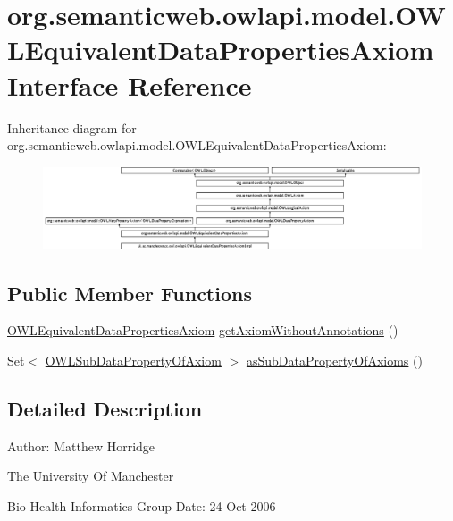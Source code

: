 \hypertarget{interfaceorg_1_1semanticweb_1_1owlapi_1_1model_1_1_o_w_l_equivalent_data_properties_axiom}{\section{org.\-semanticweb.\-owlapi.\-model.\-O\-W\-L\-Equivalent\-Data\-Properties\-Axiom Interface Reference}
\label{interfaceorg_1_1semanticweb_1_1owlapi_1_1model_1_1_o_w_l_equivalent_data_properties_axiom}
}
Inheritance diagram for org.\-semanticweb.\-owlapi.\-model.\-O\-W\-L\-Equivalent\-Data\-Properties\-Axiom\-:\begin{figure}[H]
\begin{center}
\leavevmode
\includegraphics[height=2.456140cm]{interfaceorg_1_1semanticweb_1_1owlapi_1_1model_1_1_o_w_l_equivalent_data_properties_axiom}
\end{center}
\end{figure}
\subsection*{Public Member Functions}
\begin{DoxyCompactItemize}
\item 
\hyperlink{interfaceorg_1_1semanticweb_1_1owlapi_1_1model_1_1_o_w_l_equivalent_data_properties_axiom}{O\-W\-L\-Equivalent\-Data\-Properties\-Axiom} \hyperlink{interfaceorg_1_1semanticweb_1_1owlapi_1_1model_1_1_o_w_l_equivalent_data_properties_axiom_a7f71962335b34bd767cf36bd5ded0549}{get\-Axiom\-Without\-Annotations} ()
\item 
Set$<$ \hyperlink{interfaceorg_1_1semanticweb_1_1owlapi_1_1model_1_1_o_w_l_sub_data_property_of_axiom}{O\-W\-L\-Sub\-Data\-Property\-Of\-Axiom} $>$ \hyperlink{interfaceorg_1_1semanticweb_1_1owlapi_1_1model_1_1_o_w_l_equivalent_data_properties_axiom_a223ac0f93d5c1833fc969a309a28cfaa}{as\-Sub\-Data\-Property\-Of\-Axioms} ()
\end{DoxyCompactItemize}


\subsection{Detailed Description}
Author\-: Matthew Horridge\par
 The University Of Manchester\par
 Bio-\/\-Health Informatics Group Date\-: 24-\/\-Oct-\/2006 

